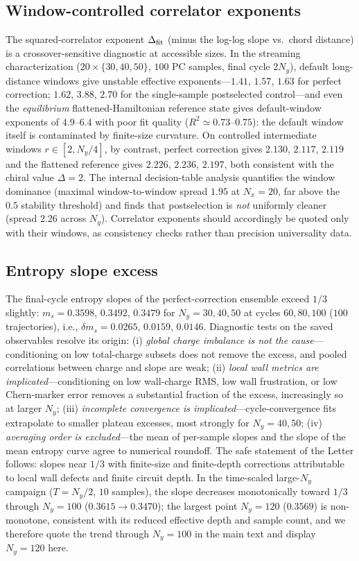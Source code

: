 \documentclass[aps,prl,onecolumn,superscriptaddress,nofootinbib]{revtex4-2}
\begin{document}
\subsection{Window-controlled correlator exponents}

The squared-correlator exponent $\Delta_{\rm fit}$ (minus the log-log slope vs.\ chord distance) is a crossover-sensitive diagnostic at accessible sizes.  In the streaming characterization ($20\times\{30,40,50\}$, $100$ PC samples, final cycle $2N_y$), default long-distance windows give unstable effective exponents---$1.41$, $1.57$, $1.63$ for perfect correction; $1.62$, $3.88$, $2.70$ for the single-sample postselected control---and even the \emph{equilibrium} flattened-Hamiltonian reference state gives default-window exponents of $4.9$--$6.4$ with poor fit quality ($R^2\simeq0.73$--$0.75$): the default window itself is contaminated by finite-size curvature.  On controlled intermediate windows $r\in[2,N_y/4]$, by contrast, perfect correction gives $2.130$, $2.117$, $2.119$ and the flattened reference gives $2.226$, $2.236$, $2.197$, both consistent with the chiral value $\Delta=2$.  The internal decision-table analysis quantifies the window dominance (maximal window-to-window spread $1.95$ at $N_x=20$, far above the $0.5$ stability threshold) and finds that postselection is \emph{not} uniformly cleaner (spread $2.26$ across $N_y$).  Correlator exponents should accordingly be quoted only with their windows, as consistency checks rather than precision universality data.

\subsection{Entropy slope excess}

The final-cycle entropy slopes of the perfect-correction ensemble exceed $1/3$ slightly: $m_s=0.3598$, $0.3492$, $0.3479$ for $N_y=30,40,50$ at cycles $60,80,100$ ($100$ trajectories), i.e., $\delta m_s=0.0265$, $0.0159$, $0.0146$.  Diagnostic tests on the saved observables resolve its origin:
(i) \emph{global charge imbalance is not the cause}---conditioning on low total-charge subsets does not remove the excess, and pooled correlations between charge and slope are weak;
(ii) \emph{local wall metrics are implicated}---conditioning on low wall-charge RMS, low wall frustration, or low Chern-marker error removes a substantial fraction of the excess, increasingly so at larger $N_y$;
(iii) \emph{incomplete convergence is implicated}---cycle-convergence fits extrapolate to smaller plateau excesses, most strongly for $N_y=40,50$;
(iv) \emph{averaging order is excluded}---the mean of per-sample slopes and the slope of the mean entropy curve agree to numerical roundoff.
The safe statement of the Letter follows: slopes near $1/3$ with finite-size and finite-depth corrections attributable to local wall defects and finite circuit depth.  In the time-scaled large-$N_y$ campaign ($T=N_y/2$, $10$ samples), the slope decreases monotonically toward $1/3$ through $N_y=100$ ($0.3615\to0.3470$); the largest point $N_y=120$ ($0.3569$) is non-monotone, consistent with its reduced effective depth and sample count, and we therefore quote the trend through $N_y=100$ in the main text and display $N_y=120$ here.
\end{document}
